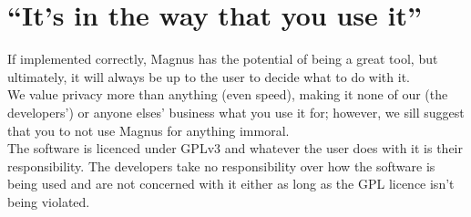 \documentclass{article}
\begin{document}
\section{``It's in the way that you use it''}
If implemented correctly, Magnus has the potential of being a great tool, but
ultimately, it will always be up to the user to decide what to do with it. \\

We value privacy more than anything (even speed), making it none of our (the developers')
or anyone elses' business what you use it for; however, we sill suggest that
you to not use Magnus for anything immoral. \\

The software is licenced under GPLv3 and whatever the user does with it
is their responsibility. The developers take no responsibility over how
the software is being used and are not concerned with it either as long
as the GPL licence isn't being violated.
\end{document}
